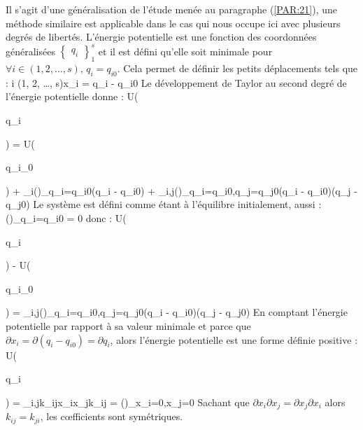 Il s'agit d'une g\'en\'eralisation de l'\'etude men\'ee au paragraphe (\ref{PAR:21}), une m\'ethode similaire est applicable dans le cas qui nous occupe ici avec plusieurs degr\'es de libert\'es. L'\'energie potentielle est une fonction des coordonn\'ees g\'en\'eralis\'ees $\begin{Bmatrix}q_{i}\end{Bmatrix}^{s}_{1}$ et il est d\'efini qu'elle soit minimale pour $\forall i \in (1, 2, \ldots, s)\text{, }q_{i} = q_{i0}$. Cela permet de d\'efinir les petits d\'eplacements tels que :
\be
	\forall i \in (1, 2, \ldots, s)\text{, }x_{i} = q_{i} - q_{i0} \label{EQ:23_1}
\ee
Le d\'eveloppement de Taylor au second degr\'e de l'\'energie potentielle donne :
\benn
	U(\begin{Bmatrix}q_{i}\end{Bmatrix}) = U(\begin{Bmatrix}q_{i_{0}}\end{Bmatrix}) + \sum_{i}\left(\right)_{q_{i}=q_{i0}}(q_{i} - q_{i0}) + \sum_{i,j}\left(\right)_{q_{i}=q_{i0},q_{j}=q_{j0}}(q_{i} - q_{i0})(q_{j} - q_{j0})
\eenn
Le syst\`eme est d\'efini comme \'etant \`a l'\'equilibre initialement, aussi :
\benn
	\left(\right)_{q_{i}=q_{i0}} = 0
\eenn
donc :
\benn
	U(\begin{Bmatrix}q_{i}\end{Bmatrix}) - U(\begin{Bmatrix}q_{i_{0}}\end{Bmatrix}) = \sum_{i,j}\left(\right)_{q_{i}=q_{i0},q_{j}=q_{j0}}(q_{i} - q_{i0})(q_{j} - q_{j0})
\eenn
En comptant l'\'energie potentielle par rapport \`a sa valeur minimale et parce que $\partial x_{i} = \partial (q_{i} - q_{i0}) = \partial q_{i}$, alors l'\'energie potentielle est une forme d\'efinie positive :
\be
	U(\begin{Bmatrix}q_{i}\end{Bmatrix}) = \sum_{i,j}k_{ij}x_{i}x_{j}k_{ij} = \left(\right)_{x_{i}=0,x_{j}=0} \label{EQ:23_2}
\ee
Sachant que $\partial x_{i}\partial x_{j} = \partial x_{j}\partial x_{i}$ alors $k_{ij} = k_{ji}$, les c{\oe}fficients sont sym\'etriques.

